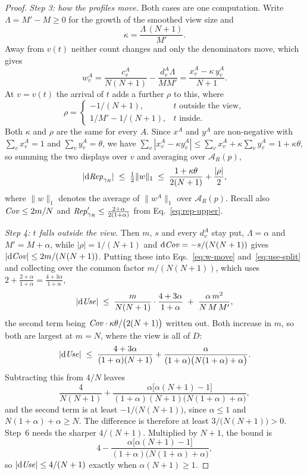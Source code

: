 \begin{proof}
\emph{Step 3: how the profiles move.}
Both cases are one computation.
Write $\Lambda=M'-M\ge0$ for the growth of the smoothed view size and
\[
\kappa=\frac{\Lambda\,(N+1)}{M'} .
\]
Away from $v(t)$ neither count changes and only the denominators move, which gives
\[
w^A_v=\frac{c^A_v}{N(N+1)}-\frac{d^A_v\Lambda}{MM'}=\frac{x^A_v-\kappa\,y^A_v}{N+1} .
\]
At $v=v(t)$ the arrival of $t$ adds a further $\rho$ to this, where
\[
\rho=\begin{cases}-1/(N+1), & t\text{ outside the view},\\[2pt]
1/M'-1/(N+1), & t\text{ inside}.\end{cases}
\]
Both $\kappa$ and $\rho$ are the same for every $A$.
Since $x^A$ and $y^A$ are non-negative with $\sum_v x^A_v=1$ and $\sum_v y^A_v=\theta$, we have
$\sum_v|x^A_v-\kappa y^A_v|\le\sum_v x^A_v+\kappa\sum_v y^A_v=1+\kappa\theta$, so summing the two
displays over $v$ and averaging over $\mathcal{A}_R(p)$,
\begin{equation}
|\mathrm{d}\mathit{Rep}_{\gamma_R}|\;\le\;\tfrac12\|w\|_1\;\le\;\frac{1+\kappa\theta}{2(N+1)}+\frac{|\rho|}{2} ,
\label{eq:w-move}
\end{equation}
where $\|w\|_1$ denotes the average of $\|w^A\|_1$ over $\mathcal{A}_R(p)$.
Recall also $\mathit{Cov}\le2m/N$ and $\mathit{Rep}'_{\gamma_R}\le\frac{2+\alpha}{2(1+\alpha)}$ from
Eq.~\eqref{eq:rep-upper}.

\emph{Step 4: $t$ falls outside the view.}
Then $m$, $s$ and every $d^A_v$ stay put, $\Lambda=\alpha$ and $M'=M+\alpha$, while
$|\rho|=1/(N+1)$ and $\mathrm{d}\mathit{Cov}=-s/(N(N+1))$ gives $|\mathrm{d}\mathit{Cov}|\le2m/(N(N+1))$.
Putting these into Eqs.~\eqref{eq:w-move} and~\eqref{eq:use-split} and collecting over the common
factor $m/(N(N+1))$, which uses $2+\tfrac{2+\alpha}{1+\alpha}=\tfrac{4+3\alpha}{1+\alpha}$,
\[
|\mathrm{d}\mathit{Use}|\;\le\;\frac{m}{N(N+1)}\cdot\frac{4+3\alpha}{1+\alpha}\;+\;\frac{\alpha\,m^2}{N\,M\,M'},
\]
the second term being $\mathit{Cov}\cdot\kappa\theta/\big(2(N+1)\big)$ written out.
Both increase in $m$, so both are largest at $m=N$, where the view is all of $D$:
\[
|\mathrm{d}\mathit{Use}|\;\le\;\frac{4+3\alpha}{(1+\alpha)(N+1)}
+\frac{\alpha}{(1+\alpha)\big(N(1+\alpha)+\alpha\big)} .
\]
Subtracting this from $4/N$ leaves
\[
\frac{4}{N(N+1)}+\frac{\alpha\big[\alpha(N+1)-1\big]}
{(1+\alpha)(N+1)\big(N(1+\alpha)+\alpha\big)} ,
\]
and the second term is at least $-1/\big(N(N+1)\big)$, since $\alpha\le1$ and
$N(1+\alpha)+\alpha\ge N$. The difference is therefore at least $3/\big(N(N+1)\big)>0$.
Step~6 needs the sharper $4/(N+1)$. Multiplied by $N+1$, the bound is
\[
4-\frac{\alpha\big[\alpha(N+1)-1\big]}{(1+\alpha)\big(N(1+\alpha)+\alpha\big)} ,
\]
so $|\mathrm{d}\mathit{Use}|\le4/(N+1)$ exactly when $\alpha(N+1)\ge1$.


\end{proof}

